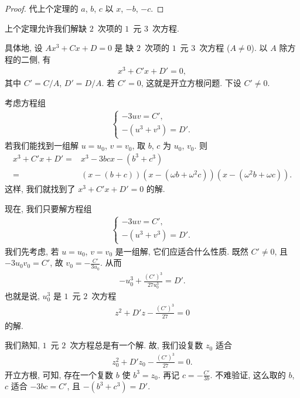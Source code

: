 \begin{proof}
    代上个定理的 \(a\), \(b\), \(c\)
    以 \(x\), \(-b\), \(-c\).
\end{proof}

上个定理允许我们解缺 \(2\)~次项的 \(1\)~元 \(3\)~次方程.

具体地, 设 \(Ax^3 + Cx + D = 0\) 是%
缺 \(2\)~次项的 \(1\)~元 \(3\)~次方程
(\(A \neq 0\)).
以 \(A\) 除方程的二侧, 有
\begin{align*}
    x^3 + C'x + D' = 0,
\end{align*}
其中 \(C' = C/A\), \(D' = D/A\).
若 \(C' = 0\), 这就是开立方根问题.
下设 \(C' \neq 0\).

考虑方程组
\begin{align*}
    \begin{cases}
        -3uv = C', \\
        -(u^3 + v^3) = D'.
    \end{cases}
\end{align*}
若我们能找到一组解 \(u = u_0\), \(v = v_0\),
取 \(b\), \(c\) 为 \(u_0\), \(v_0\).
则
\begin{align*}
    x^3 + C'x + D'
    = {} & x^3 - 3bcx - (b^3 + c^3)                   \\
    = {} & (x - (b + c))(x - (\omega b + \omega^2 c))
    (x - (\omega^2 b + \omega c)).
\end{align*}
这样, 我们就找到了 \(x^3 + C'x + D' = 0\) 的解.

现在, 我们只要解方程组
\begin{align*}
    \begin{cases}
        -3uv = C', \\
        -(u^3 + v^3) = D'.
    \end{cases}
\end{align*}
我们先考虑, 若 \(u = u_0\), \(v = v_0\)
是一组解, 它们应适合什么性质.
既然 \(C' \neq 0\),
且 \(-3u_0 v_0 = C'\),
故 \(v_0 = -\frac{C'}{3u_0}\).
从而
\begin{align*}
    -u_0^3 + \frac{(C')^3}{27u_0^3} = D'.
\end{align*}
也就是说, \(u_0^3\) 是 \(1\)~元 \(2\)~次方程
\begin{align*}
    z^2 + D'z - \frac{(C')^3}{27} = 0
\end{align*}
的解.

我们熟知, \(1\)~元 \(2\)~次方程总是有一个解.
故, 我们设复数 \(z_0\) 适合
\begin{align*}
    z_0^2 + D'z_0 - \frac{(C')^3}{27} = 0.
\end{align*}
开立方根, 可知, 存在一个复数 \(b\)
使 \(b^3 = z_0\).
再记 \(c = -\frac{C'}{3b}\).
不难验证, 这么取的 \(b\), \(c\)
适合
\(-3bc = C'\),
且 \(-(b^3 + c^3) = D'\).


